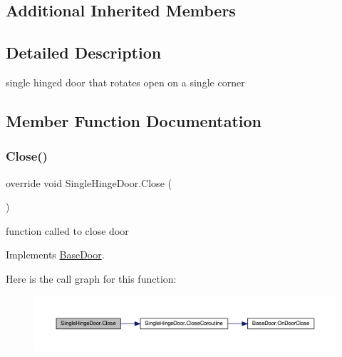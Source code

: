 \subsection*{Additional Inherited Members}


\subsection{Detailed Description}
single hinged door that rotates open on a single corner 



\subsection{Member Function Documentation}
\mbox{\label{class_single_hinge_door_a19848e36fb259f92594916d1af76d3b4}} 
\subsubsection{\texorpdfstring{Close()}{Close()}}
{\footnotesize\ttfamily override void Single\+Hinge\+Door.\+Close (\begin{DoxyParamCaption}{ }\end{DoxyParamCaption})\hspace{0.3cm}{\ttfamily [virtual]}}



function called to close door 



Implements \mbox{\hyperlink{class_base_door_a94151e5cbf90bd3d2b55f339b87916c7}{Base\+Door}}.

Here is the call graph for this function\+:
\nopagebreak
\begin{figure}[H]
\begin{center}
\leavevmode
\includegraphics[width=350pt]{class_single_hinge_door_a19848e36fb259f92594916d1af76d3b4_cgraph}
\end{center}
\end{figure}
\mbox{\label{class_single_hinge_door_a6b1760cbc6ac5ed4c0e9d7ecb10d2606}} 
